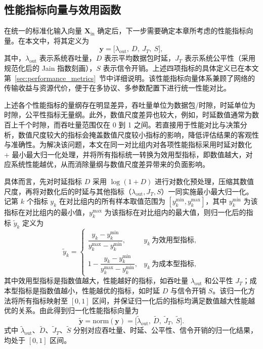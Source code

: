 \subsection{性能指标向量与效用函数}
\label{subsec:sim_mapping_utility}

在统一的标准化输入向量 $\mathbf{X}_{\mathrm{in}}$ 确定后，下一步需要确定本章所考虑的性能指标向量。在本文中，将其定义为
\begin{equation}
	\mathbf{y}=\big[\lambda_{\mathrm{out}},\ D,\ J_T,\ S\big],
\end{equation}
其中，$\lambda_{\mathrm{out}}$ 表示系统吞吐量，$D$ 表示平均数据包时延，$J_T$ 表示系统公平性（采用规范化后的 Jain 指数刻画），$S$ 表示信令开销。上述四项指标的具体定义已在本文第~\ref{sec:performance_metrics}~节中详细说明。该性能指标向量体系兼顾了网络的传输收益与资源代价，便于在多协议、多参数配置下进行统一性能对比。

上述各个性能指标的量纲存在明显差异，吞吐量单位为数据包/时隙，时延单位为时隙，公平性指标无量纲。此外，数值尺度差异也较大，例如，时延数值通常为数百上千个时隙，而吞吐量范围仅在 0 到 1 之间。若直接用于性能对比与决策分析，数值尺度较大的指标会掩盖数值尺度较小指标的影响，降低评估结果的客观性与准确性。为解决该问题，本文在同一对比组内对各项性能指标采用时延对数化 + 最小最大归一化处理，并将所有指标统一转换为效用型指标，即数值越大，对应系统性能越优，从而消除量纲与数值尺度差异带来的负面影响。

具体而言，先对时延指标 $D$ 采用 $\log(1+D)$ 进行对数化预处理，压缩其数值尺度，再将对数化后的时延与其他指标（$\lambda_{\mathrm{out}}, J_T, S$）一同实施最小最大归一化。
记第 $k$ 个指标 $y_k$ 在对比组内的所有样本取值范围为 $[y_k^{\min}, y_k^{\max}]$，其中 $y_k^{\min}$ 为该指标在对比组内的最小值，$y_k^{\max}$ 为该指标在对比组内的最大值，则归一化后的指标 $\tilde{y}_k$ 定义为
\begin{equation}
	\tilde{y}_k =
	\begin{cases}
	\dfrac{y_k-y_k^{\min}}{y_k^{\max}-y_k^{\min}}, & y_k \ \text{为效用型指标},\\[10pt]
	1-\dfrac{y_k-y_k^{\min}}{y_k^{\max}-y_k^{\min}}, & y_k \ \text{为成本型指标},
	\end{cases}
\end{equation}
其中效用型指标是指数值越大，性能越好的指标，如吞吐量 $\lambda_{\mathrm{out}}$ 和公平性 $J_T$；成本型指标是指数值越小，性能越优的指标，如时延 $D$ 与信令开销 $S$。该归一化方法将所有指标映射至 $[0,1]$ 区间，并保证归一化后的指标均满足数值越大性能越优的关系。由此得到归一化性能指标向量为
\begin{equation}
	\tilde{\mathbf{y}}=\mathrm{norm}(\mathbf{y})
	=\big[\tilde{\lambda}_{\mathrm{out}},\ \tilde{D},\ \tilde{J}_T,\ \tilde{S}\big].
\end{equation}
式中 $\tilde{\lambda}_{\mathrm{out}}$、$\tilde{D}$、$\tilde{J}_T$、$\tilde{S}$ 分别对应吞吐量、时延、公平性、信令开销的归一化结果，均处于 $[0,1]$ 区间。

